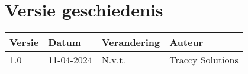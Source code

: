 \section*{Versie geschiedenis} 

\begin{table}[h]
\begin{tabular}{|l|l|l|l|}
\hline
\rowcolor[HTML]{4472C4} 
{\color[HTML]{FFFFFF} \textbf{Versie}} &
  {\color[HTML]{FFFFFF} \textbf{Datum}} &
  {\color[HTML]{FFFFFF} \textbf{Verandering}} &
  {\color[HTML]{FFFFFF} \textbf{Auteur}} \\ \hline
\rowcolor[HTML]{D9E1F2} 1.0 & \multicolumn{1}{c|}{\cellcolor[HTML]{D9E1F2}11-04-2024} & N.v.t. & Traccy Solutions \\




\end{tabular}
\end{table}